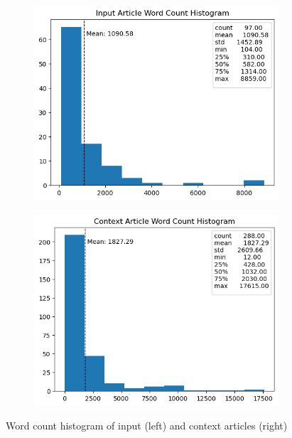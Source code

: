 \documentclass{article}
\begin{document}
\begin{appendices}
\label{appendix:word-count-histogram}
\begin{figure}[H]
\begin{subfigure}{.5\textwidth}
  \centering
  \includegraphics[width=\linewidth]{img/word_count_context_hist.png}
\end{subfigure}
\begin{subfigure}{.5\textwidth}
  \centering
  \includegraphics[width=\linewidth]{img/word_count_input_hist.png}
\end{subfigure}%
\caption{Word count histogram of input (left) and context articles (right)}
\end{figure}


\end{appendices}
\end{document}

